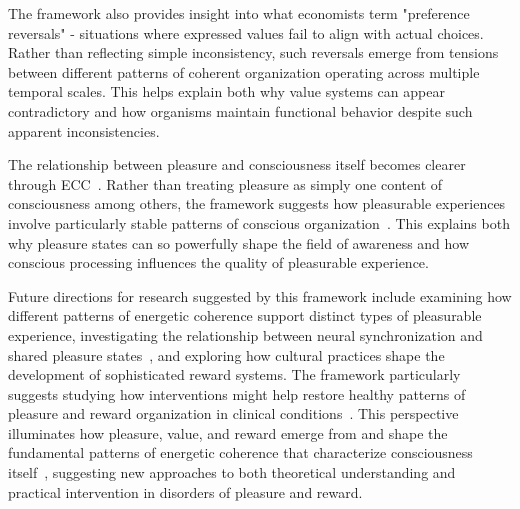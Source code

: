 The framework also provides insight into what economists term "preference reversals" - situations where expressed values fail to align with actual choices. Rather than reflecting simple inconsistency, such reversals emerge from tensions between different patterns of coherent organization operating across multiple temporal scales. This helps explain both why value systems can appear contradictory and how organisms maintain functional behavior despite such apparent inconsistencies.

The relationship between pleasure and consciousness itself becomes clearer through ECC~\cite{seth2024conscious}. Rather than treating pleasure as simply one content of consciousness among others, the framework suggests how pleasurable experiences involve particularly stable patterns of conscious organization~\cite{da2024mathematical}. This explains both why pleasure states can so powerfully shape the field of awareness and how conscious processing influences the quality of pleasurable experience.

Future directions for research suggested by this framework include examining how different patterns of energetic coherence support distinct types of pleasurable experience, investigating the relationship between neural synchronization and shared pleasure states~\cite{pinotsis2023cytoelectric}, and exploring how cultural practices shape the development of sophisticated reward systems. The framework particularly suggests studying how interventions might help restore healthy patterns of pleasure and reward organization in clinical conditions~\cite{bosl2025dynamical}. This perspective illuminates how pleasure, value, and reward emerge from and shape the fundamental patterns of energetic coherence that characterize consciousness itself~\cite{juarrero2023context, harris2019conscious, hunt2024electromagnetic, butlin2023consciousnessartificialintelligenceinsights}, suggesting new approaches to both theoretical understanding and practical intervention in disorders of pleasure and reward.

